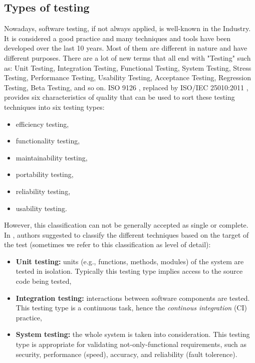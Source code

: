 \subsection{Types of testing}

Nowadays, software testing, if not always applied, is well-known
in the Industry. It is considered a good practice and many
techniques and tools have been developed over the last 10 years.
Most of them are different in nature and have different purposes.
There are a lot of new terms that all end with "Testing" such as:
Unit Testing, Integration Testing, Functional Testing, System
Testing, Stress Testing, Performance Testing, Usability Testing,
Acceptance Testing, Regression Testing, Beta Testing, and so on.
ISO 9126 \cite{iso9126}, replaced by ISO/IEC 25010:2011
\cite{10951538}, provides six characteristics of quality that can
be used to sort these testing techniques into six testing types:

\begin{itemize}
\item efficiency testing,
\item functionality testing,
\item maintainability testing,
\item portability testing,
\item reliability testing,
\item usability testing.
\end{itemize}

However, this classification can not be generally accepted as
single or complete. In \cite{4425813}, authors suggested to
classify the different techniques based on the target of the
test (sometimes we refer to this classification as level of
detail):

\begin{itemize}
\item \textbf{Unit testing:} units (e.g., functions, methods,
modules) of the system are tested in isolation. Typically this
testing type implies access to the source code being tested,

\item \textbf{Integration testing:} interactions between software
components are tested. This testing type is a continuous task,
hence the \textit{continous integration} (CI) practice,

\item \textbf{System testing:} the whole system is taken into
consideration. This testing type is appropriate for validating
not-only-functional requirements, such as security, performance
(speed), accuracy, and reliability (fault tolerence).
\end{itemize}

